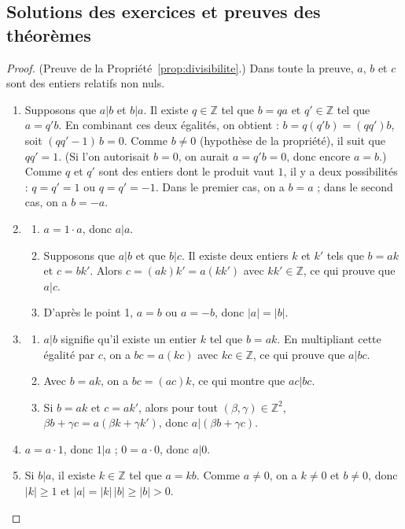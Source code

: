 \begin{corrige}
\section{Solutions des exercices et preuves des th\'eor\`emes}
\begin{proof}
(Preuve de la Propri\'et\'e~\ref{prop:divisibilite}.)
Dans toute la preuve, $a$, $b$ et $c$ sont des entiers relatifs non nuls.
\begin{enumerate}
\item Supposons que $a|b$ et $b|a$.
      Il existe $q \in \mathbb{Z}$ tel que $b = q a$ et $q' \in \mathbb{Z}$ tel que $a = q' b$.
      En combinant ces deux \'egalit\'es, on obtient : $b = q ( q' b) = (q q') b$, soit $(qq' - 1)\, b = 0$.
      Comme $b \neq 0$ (hypoth\`ese de la propri\'et\'e), il suit que $qq' = 1$.
      (Si l'on autorisait $b = 0$, on aurait $a = q' b = 0$, donc encore $a = b$.)
      Comme $q$ et $q'$ sont des entiers dont le produit vaut $1$, il y a deux possibilit\'es :
            $q = q' = 1$ ou $q = q' = -1$.
      Dans le premier cas, on a $b = a$ ; dans le second cas, on a $b = - a$.
\item \begin{enumerate}
      \item $a = 1 \cdot a$, donc $a | a$.
      \item Supposons que $a | b $ et que $b | c$.
            Il existe deux entiers $k$ et $k'$ tels que $b = ak$ et $c = bk'$.
            Alors $c = (ak)k' = a(kk')$ avec $kk' \in \mathbb{Z}$, ce qui prouve que $a | c$.
      \item D'apr\`es le point 1, $a = b$ ou $a = -b$, donc $|a| = |b|$.
      \end{enumerate}
\item \begin{enumerate}
      \item $a | b$ signifie qu'il existe un entier $k$ tel que $b = ak$.
            En multipliant cette \'egalit\'e par $c$, on a $b c = a (kc)$ avec $kc \in \mathbb{Z}$, 
            ce qui prouve que $a | bc$.
      \item Avec $b = ak$, on a $bc = (ac) k$, ce qui montre que $ac | bc$.
      \item Si $b = ak$ et $c = ak'$, alors pour tout $(\beta, \gamma) \in \mathbb{Z}^2$,
            $\beta b + \gamma c = a(\beta k + \gamma k')$, donc $a | (\beta b + \gamma c)$.
      \end{enumerate}
\item $a = a \cdot 1$, donc $1 | a$ ; $0 = a \cdot 0$, donc $a | 0$.
\item Si $b | a$, il existe $k \in \mathbb{Z}$ tel que $a = kb$. Comme $a \neq 0$, on a $k \neq 0$ et $b \neq 0$, donc $|k| \geq 1$ et
      $|a| = |k|\,|b| \geq |b| > 0$.
\end{enumerate}
\end{proof}
%

\end{corrige}
